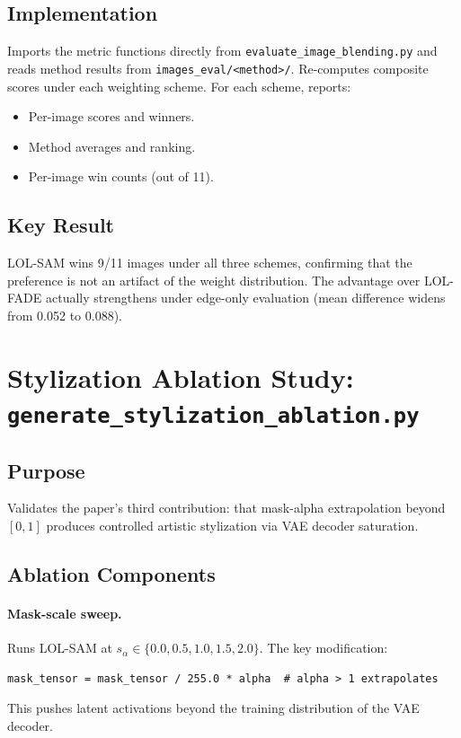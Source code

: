 \documentclass[11pt,a4paper]{article}
\begin{document}
\subsection{Implementation}

Imports the metric functions directly from \texttt{evaluate\_image\_blending.py} and reads method results from \texttt{images\_eval/<method>/}. Re-computes composite scores under each weighting scheme. For each scheme, reports:
\begin{itemize}
  \item Per-image scores and winners.
  \item Method averages and ranking.
  \item Per-image win counts (out of 11).
\end{itemize}

\subsection{Key Result}

LOL-SAM wins 9/11 images under all three schemes, confirming that the preference is not an artifact of the weight distribution. The advantage over LOL-FADE actually strengthens under edge-only evaluation (mean difference widens from 0.052 to 0.088).

\section{Stylization Ablation Study: \texttt{generate\_stylization\_ablation.py}}

\subsection{Purpose}

Validates the paper's third contribution: that mask-alpha extrapolation beyond $[0, 1]$ produces controlled artistic stylization via VAE decoder saturation.

\subsection{Ablation Components}

\paragraph{Mask-scale sweep.}
Runs LOL-SAM at $s_\alpha \in \{0.0, 0.5, 1.0, 1.5, 2.0\}$. The key modification:
\begin{lstlisting}[style=python]
mask_tensor = mask_tensor / 255.0 * alpha  # alpha > 1 extrapolates
\end{lstlisting}
This pushes latent activations beyond the training distribution of the VAE decoder.
\end{document}
